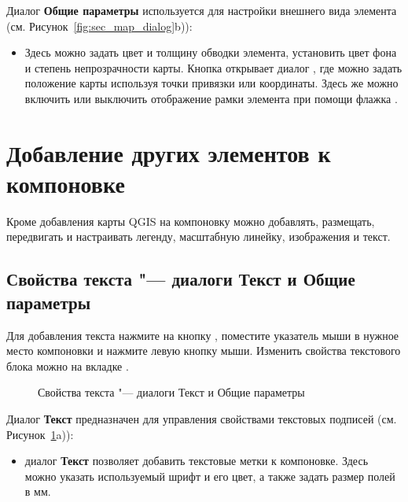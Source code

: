 
Диалог \textbf{Общие параметры} используется для настройки внешнего
вида элемента (см. Рисунок~\ref{fig:sec_map_dialog}b)):

\begin{itemize}[label=--]
\item Здесь можно задать цвет и толщину обводки элемента, установить цвет
фона и степень непрозрачности карты. Кнопка  открывает
диалог , где можно задать положение карты
используя точки привязки или координаты. Здесь же можно включить или
выключить отображение рамки элемента при помощи флажка
.
\end{itemize}

\section{Добавление других элементов к компоновке}

Кроме добавления карты QGIS на компоновку можно добавлять, размещать,
передвигать и настраивать легенду, масштабную линейку, изображения и
текст.

\subsection{Свойства текста "--- диалоги Текст и Общие параметры}

Для добавления текста нажмите на кнопку
, поместите указатель мыши в
нужное место компоновки и нажмите левую кнопку мыши. Изменить свойства
текстового блока можно на вкладке .

\begin{figure}[ht]
\centering
   \hspace{1cm}
   \caption{Свойства текста "--- диалоги Текст и Общие параметры \wincaption}\label{fig:label_option}
\end{figure}


Диалог \textbf{Текст} предназначен для управления свойствами текстовых
подписей (см. Рисунок~\ref{fig:label_option}a)):

\begin{itemize}[label=--]
\item диалог \textbf{Текст} позволяет добавить текстовые метки к
компоновке. Здесь можно указать используемый шрифт и его цвет, а также
задать размер полей в мм.
\end{itemize}

